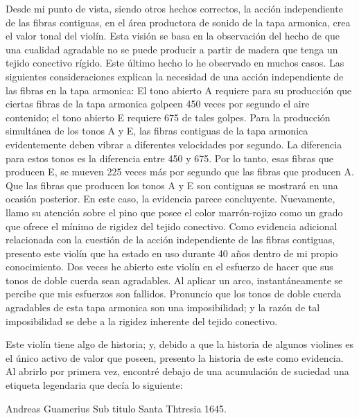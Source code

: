 \documentclass[12pt]{book}
\begin{document}
Desde mi punto de vista, siendo otros hechos correctos, la acción independiente de las fibras contiguas, en el área productora de sonido de la tapa armonica, crea el valor tonal del violín. Esta visión se basa en la observación del hecho de que una cualidad agradable no se puede producir a partir de madera que tenga un tejido conectivo rígido. Este último hecho lo he observado en muchos casos. Las siguientes consideraciones explican la necesidad de una acción independiente de las fibras en la tapa armonica: El tono abierto A requiere para su producción que ciertas fibras de la tapa armonica golpeen 450 veces por segundo el aire contenido; el tono abierto E requiere 675 de tales golpes. Para la producción simultánea de los tonos A y E, las fibras contiguas de la tapa armonica evidentemente deben vibrar a diferentes velocidades por segundo. La diferencia para estos tonos es la diferencia entre 450 y 675. Por lo tanto, esas fibras que producen E, se mueven 225 veces más por segundo que las fibras que producen A. Que las fibras que producen los tonos A y E son contiguas se mostrará en una ocasión posterior. En este caso, la evidencia parece concluyente. Nuevamente, llamo su atención sobre el pino que posee el color marrón-rojizo como un grado que ofrece el mínimo de rigidez del tejido conectivo. Como evidencia adicional relacionada con la cuestión de la acción independiente de las fibras contiguas, presento este violín que ha estado en uso durante 40 años dentro de mi propio conocimiento. Dos veces he abierto este violín en el esfuerzo de hacer que sus tonos de doble cuerda sean agradables. Al aplicar un arco, instantáneamente se percibe que mis esfuerzos son fallidos. Pronuncio que los tonos de doble cuerda agradables de esta tapa armonica son una imposibilidad; y la razón de tal imposibilidad se debe a la rigidez inherente del tejido conectivo.

Este violín tiene algo de historia; y, debido a que la historia de algunos violines es el único activo de valor que poseen, presento la historia de este como evidencia. Al abrirlo por primera vez, encontré debajo de una acumulación de suciedad una etiqueta legendaria que decía lo siguiente:

Andreas Guamerius
Sub titulo Santa Thtresia 1645.
\end{document}
